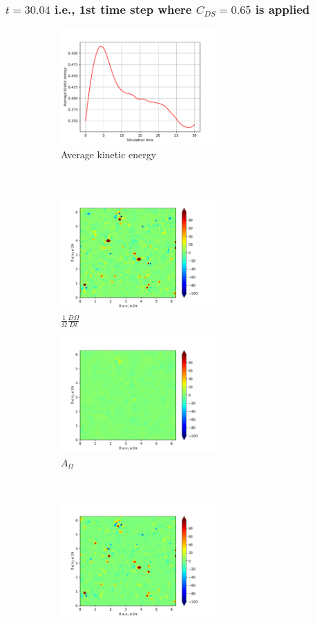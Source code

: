 \subsubsection{$t=30.04$ i.e., 1st time step where $C_{DS}=0.65$ is applied} 
\begin{figure}[H]
    \begin{subfigure}[H]{0.45\textwidth}
        \includegraphics[height=1.75in]{media/run-cds-65/ke-average1320}
        \caption{Average kinetic energy}
    \end{subfigure}
    ~
    \begin{subfigure}[H]{0.45\textwidth}
        \includegraphics[height=1.75in]{media/run-cds-65/enst-1320}
        \caption{$\frac{1}{\Omega} \frac{D \Omega}{Dt}$}
    \end{subfigure}
    \newline
    \begin{subfigure}{0.45\textwidth}
        \includegraphics[height=1.75in]{media/run-cds-65/A-enst-1320}
        \caption{$A_{\Omega}$}
    \end{subfigure}
    ~
    \begin{subfigure}{0.45\textwidth}
        \includegraphics[height=1.75in]{media/run-cds-65/Pi-enst-1320}

\end{subfigure}
\end{figure}
